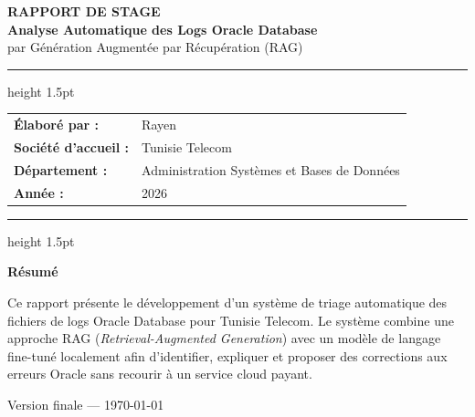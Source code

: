 \documentclass[12pt,a4paper]{report}
\begin{document}

\begin{titlepage}
\thispagestyle{empty}
\begin{center}

\vspace*{0.5cm}

{\Huge\bfseries\textcolor{ttblue}{RAPPORT DE STAGE}}\\[0.5cm]
{\Large\bfseries Analyse Automatique des Logs Oracle Database}\\[0.2cm]
{\large par Génération Augmentée par Récupération (RAG)}

\vspace{1.5cm}
\hrule height 1.5pt
\vspace{0.5cm}

\begin{tabular}{ll}
\textbf{Élaboré par :}       & Rayen \\[0.3cm]
\textbf{Société d'accueil :} & Tunisie Telecom \\[0.3cm]
\textbf{Département :}       & Administration Systèmes et Bases de Données \\[0.3cm]
\textbf{Année :}             & 2026 \\
\end{tabular}

\vspace{0.5cm}
\hrule height 1.5pt
\vspace{1.5cm}

{\large\textbf{Résumé}}\\[0.4cm]
\begin{minipage}{0.88\textwidth}
\justifying
Ce rapport présente le développement d'un système de triage automatique
des fichiers de logs Oracle Database pour Tunisie Telecom.
Le système combine une approche RAG (\emph{Retrieval-Augmented Generation})
avec un modèle de langage fine-tuné localement afin d'identifier, expliquer
et proposer des corrections aux erreurs Oracle sans recourir à un service
cloud payant.
\end{minipage}

\vfill
{\small Version finale --- \today}
\end{center}
\end{titlepage}

\end{document}
